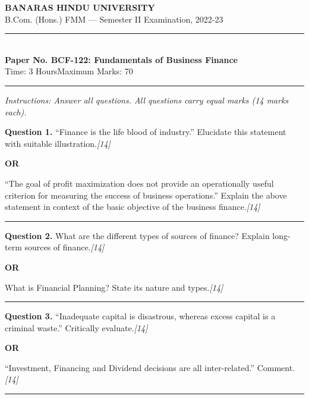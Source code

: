 \documentclass[11pt,a4paper]{article}
\newcommand{\pts}[1]{\hfill   \textit{[#1]}}
\begin{document}
\begin{center}
  {\large\bfseries BANARAS HINDU UNIVERSITY}\\[2pt]
  {\normalsize B.Com. (Hons.) FMM --- Semester II Examination, 2022-23}\\[6pt]
  \rule{0.8\linewidth}{0.5pt}\\[6pt]
  {\large\bfseries Paper No. BCF-122: Fundamentals of Business Finance}\\[4pt]
  {\normalsize Time: 3 Hours\hfill Maximum Marks: 70}
\end{center}

\rule{\linewidth}{0.4pt}

\smallskip



\noindent   \textit{Instructions: Answer all questions. All questions carry equal marks (14 marks each).}

\bigskip




\noindent   \textbf{Question 1.}
``Finance is the life blood of industry.'' Elucidate this statement with suitable illustration.\pts{14}

\centerline{   \textbf{OR}}

``The goal of profit maximization does not provide an operationally useful criterion for measuring the success of business operations.'' Explain the above statement in context of the basic objective of the business finance.\pts{14}

\medskip\rule{\linewidth}{0.2pt}




\noindent   \textbf{Question 2.}
What are the different types of sources of finance? Explain long-term sources of finance.\pts{14}

\centerline{   \textbf{OR}}

What is Financial Planning? State its nature and types.\pts{14}

\medskip\rule{\linewidth}{0.2pt}




\noindent   \textbf{Question 3.}
``Inadequate capital is disastrous, whereas excess capital is a criminal waste.'' Critically evaluate.\pts{14}

\centerline{   \textbf{OR}}

``Investment, Financing and Dividend decisions are all inter-related.'' Comment.\pts{14}

\medskip\rule{\linewidth}{0.2pt}
\end{document}
